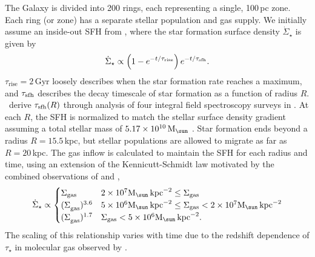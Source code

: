 \documentclass[fleqn,
usenatbib]{mnras}
\newcommand{\JJ}{\citetalias{james+21}}
\newcommand{\Mo}{ {\rm M}_{\sun}}
\begin{document}
The Galaxy is divided into 200 rings, each representing a single, 100\,pc zone. Each ring (or zone) has a separate stellar population and gas supply. We initially assume an inside-out SFH from \JJ, where the star formation surface density $\dot{\Sigma}_\star$ is given by 
\begin{equation}\label{eq:inside_out}
    \dot{\Sigma}_\star \propto \left(1-e^{-t/\tau_{\rm rise}}\right) e^{-t/\tau_{\rm sfh}}.
\end{equation}
$\tau_\text{rise}=2$\,Gyr loosely describes when the star formation rate reaches a maximum, and $\tau_{\rm sfh}$ describes the decay timescale of star formation as a function of radius $R$. \JJ\ derive $\tau_{\rm sfh}(R)$ through analysis of four integral field spectroscopy surveys in \cite{sanches20}. At each $R$, the SFH is normalized to match the stellar surface density gradient \citep{BHG16} assuming a total stellar mass of $5.17\times10^{10}\,\Mo$ \citep{LM15}. Star formation ends beyond a radius $R=15.5\,$kpc, but stellar populations are allowed to migrate as far as $R=20\,$kpc.  
The gas inflow is calculated to maintain the SFH for each radius and time, using an extension of the Kennicutt-Schmidt law \citep{kennicutt98} motivated by the combined observations of \citet{bigiel+10} and \citet{leroy+13}, 
\begin{equation}
\dot{\Sigma}_{\star} \propto 
\begin{cases}
    {\Sigma}_{\rm gas} & 2\times 10^7 \Mo\,{\rm kpc}^{-2} \leq \Sigma_{\rm gas} \\ 
    {(\Sigma}_{\rm gas})^{3.6} & 5\times 10^6 \Mo\,{\rm kpc}^{-2}\leq \Sigma_{\rm gas} < 2\times10^7 \Mo\,{\rm kpc}^{-2}\\ 
    {(\Sigma}_{\rm gas})^{1.7} & \Sigma_{\rm gas} < 5\times10^6 \Mo\,{\rm kpc}^{-2}.
\end{cases}
\end{equation} 
The scaling of this relationship varies with time due to the redshift dependence of $\tau_\star$ in molecular gas observed by \citet{tacconi18}.
\end{document}
